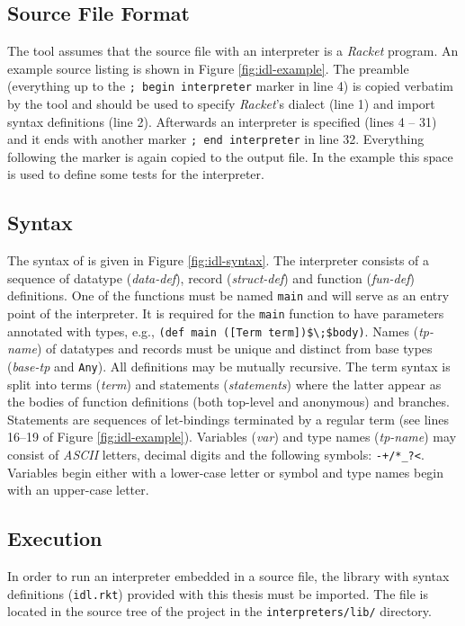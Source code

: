 \subsection*{Source File Format}
The tool assumes that the source file with an interpreter is a \textit{Racket} program.
An example source listing is shown in Figure \ref{fig:idl-example}.
The preamble (everything up to the \lstinline!; begin interpreter! marker in line 4) is copied verbatim by the tool and should be used to specify \emph{Racket}'s dialect (line 1) and import syntax definitions (line 2).
Afterwards an interpreter is specified (lines 4 -- 31) and it ends with another marker \lstinline!; end interpreter! in line 32.
Everything following the marker is again copied to the output file.
In the example this space is used to define some tests for the interpreter.

\subsection*{Syntax}
The syntax of \IDL{} is given in Figure \ref{fig:idl-syntax}.
The interpreter consists of a sequence of datatype (\textit{data-def}), record (\textit{struct-def}) and function (\textit{fun-def}) definitions.
One of the functions must be named \lstinline!main! and will serve as an entry point of the interpreter.
It is required for the \lstinline!main! function to have parameters annotated with types, e.g., \lstinline!(def main ([Term term])$\;$body)!.
Names (\textit{tp-name}) of datatypes and records must be unique and distinct from base types (\textit{base-tp} and \lstinline!Any!).
All definitions may be mutually recursive.
The term syntax is split into terms (\textit{term}) and statements (\textit{statements}) where the latter appear as the bodies of function definitions (both top-level and anonymous) and branches.
Statements are sequences of let-bindings terminated by a regular term (see lines 16--19 of Figure \ref{fig:idl-example}).
Variables (\textit{var}) and type names (\textit{tp-name}) may consist of \textit{ASCII} letters, decimal digits and the following symbols: \lstinline!-+/*_?<!.
Variables begin either with a lower-case letter or symbol and type names begin with an upper-case letter.

\subsection*{Execution}
In order to run an interpreter embedded in a source file, the library with syntax definitions (\lstinline!idl.rkt!) provided with this thesis must be imported.
The file is located in the source tree of the project in the \lstinline!interpreters/lib/! directory.

